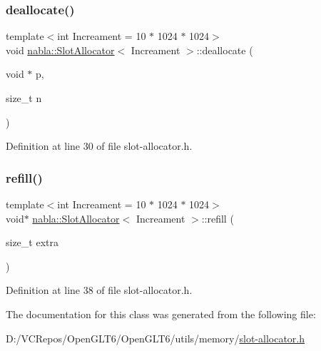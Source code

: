 \subsubsection{\texorpdfstring{deallocate()}{deallocate()}}
{\footnotesize\ttfamily template$<$int Increament = 10 $\ast$ 1024 $\ast$ 1024$>$ \\
void \mbox{\hyperlink{classnabla_1_1_slot_allocator}{nabla\+::\+Slot\+Allocator}}$<$ Increament $>$\+::deallocate (\begin{DoxyParamCaption}\item[{void $\ast$}]{p,  }\item[{size\+\_\+t}]{n }\end{DoxyParamCaption})\hspace{0.3cm}{\ttfamily [inline]}}



Definition at line 30 of file slot-\/allocator.\+h.

\mbox{\label{classnabla_1_1_slot_allocator_af32ebf292dd6f77447e64cf0e3571e50}} 
\subsubsection{\texorpdfstring{refill()}{refill()}}
{\footnotesize\ttfamily template$<$int Increament = 10 $\ast$ 1024 $\ast$ 1024$>$ \\
void$\ast$ \mbox{\hyperlink{classnabla_1_1_slot_allocator}{nabla\+::\+Slot\+Allocator}}$<$ Increament $>$\+::refill (\begin{DoxyParamCaption}\item[{size\+\_\+t}]{extra }\end{DoxyParamCaption})\hspace{0.3cm}{\ttfamily [inline]}}



Definition at line 38 of file slot-\/allocator.\+h.



The documentation for this class was generated from the following file\+:\begin{DoxyCompactItemize}
\item 
D\+:/\+V\+C\+Repos/\+Open\+G\+L\+T6/\+Open\+G\+L\+T6/utils/memory/\mbox{\hyperlink{slot-allocator_8h}{slot-\/allocator.\+h}}\end{DoxyCompactItemize}
